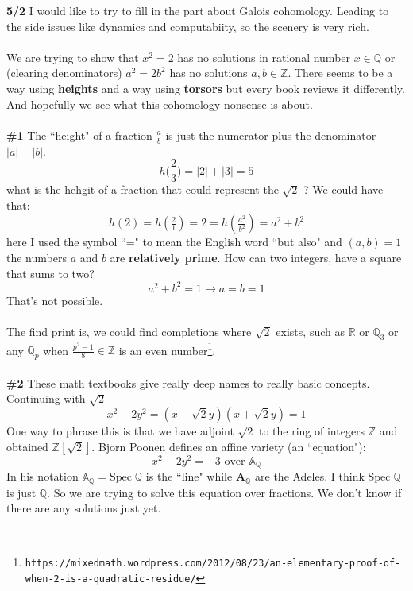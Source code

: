 \documentclass[12pt]{article}
\begin{document}
\newpage

\noindent \textbf{5/2} I would like to try to fill in the part about Galois cohomology.  Leading to the side issues like dynamics and computabiity, so the scenery is very rich.  \\ \\
We are trying to show that $x^2 = 2$ has no solutions in rational number $x \in \mathbb{Q}$ or (clearing denominators) $a^2 = 2b^2 $ has no solutions $a,b \in \mathbb{Z}$.  There seems to be a way using \textbf{heights} and a way using \textbf{torsors} but every book reviews it differently.  And hopefully we see what this cohomology nonsense is about. \\ \\
\textbf{\#1} The ``height" of a fraction $\frac{a}{b}$ is just the numerator plus the denominator $|a| + |b|$.
$$  h \big(\frac{2}{3}\big) = |2| + |3| = 5$$
what is the hehgit of a fraction that could represent the $\sqrt{2}$ ?  We could have that:
$$ h(2) = h(\tfrac{2}{1}) = 2 = h(\tfrac{a^2}{b^2})  = a^2 + b^2$$
here I used the symbol ``=" to mean the English word ``but also" and $(a,b) = 1$ the numbers $a$ and $b$ are \textbf{relatively prime}.  How can two integers, have a square that sums to two?  
$$ a^2 + b^2 = 1 \longrightarrow a = b = 1 $$
That's not possible.   \\ \\
The find print is, we could find completions where $\sqrt{2}$ exists, such as $\mathbb{R}$ or $\mathbb{Q}_3$ or any $\mathbb{Q}_p$ when $\frac{p^2-1}{8}\in \mathbb{Z}$ is an even number\footnote{\texttt{https://mixedmath.wordpress.com/2012/08/23/an-elementary-proof-of-when-2-is-a-quadratic-residue/}}. \\ \\
\textbf{\#2} These math textbooks give really deep names to really basic concepts.  Continuing with $\sqrt{2}$
$$ x^2 - 2y^2 = (x - \sqrt{2} y) ( x + \sqrt{2}y )=  1 $$
One way to phrase this is that we have adjoint $\sqrt{2}$ to the ring of integers $\mathbb{Z}$ and obtained $\mathbb{Z}[\sqrt{2}]$.  Bjorn Poonen defines an affine variety (an ``equation"):
$$ x^2 - 2y^2 = -3  \text{ over } \mathbb{A}_\mathbb{Q}$$
In his notation $\mathbb{A}_\mathbb{Q} = \mathrm{Spec}\; \mathbb{Q} $ is the ``line" while $\mathbf{A}_\mathbb{Q}$ are the Adeles.  I think $\mathrm{Spec}\;\mathbb{Q}$ is just $\mathbb{Q}$. So we are trying to solve this equation over fractions.  We don't know if there are any solutions just yet. \\ \\
\end{document}
